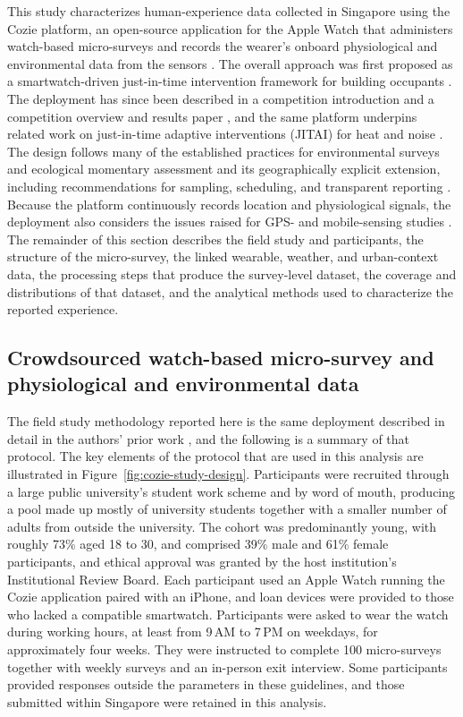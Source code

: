 \documentclass[]{interact}
\begin{document}
This study characterizes human-experience data collected in Singapore using the Cozie platform, an open-source application for the Apple Watch that administers watch-based micro-surveys and records the wearer's onboard physiological and environmental data from the sensors \citep{Tartarini2023-iu}.
The overall approach was first proposed as a smartwatch-driven just-in-time intervention framework for building occupants \citep{Miller2022-dy}.
The deployment has since been described in a competition introduction and a competition overview and results paper \citep{Miller2023-wi,Miller2025-qu}, and the same platform underpins related work on just-in-time adaptive interventions (JITAI) for heat and noise \citep{Miller2025-sv}.
The design follows many of the established practices for environmental surveys and ecological momentary assessment and its geographically explicit extension, including recommendations for sampling, scheduling, and transparent reporting \citep{Reichert2020-fs,Kingsbury2024-qe,Liao2016-ya,Graham2021-en}.
Because the platform continuously records location and physiological signals, the deployment also considers the issues raised for GPS- and mobile-sensing studies \citep{Kerr2011-ve,Fuller2017-xg}.
The remainder of this section describes the field study and participants, the structure of the micro-survey, the linked wearable, weather, and urban-context data, the processing steps that produce the survey-level dataset, the coverage and distributions of that dataset, and the analytical methods used to characterize the reported experience.

\subsection{Crowdsourced watch-based micro-survey and physiological and environmental data}\label{sec:methods-context}
The field study methodology reported here is the same deployment described in detail in the authors' prior work \citep{Miller2025-sv}, and the following is a summary of that protocol. 
The key elements of the protocol that are used in this analysis are illustrated in Figure~\ref{fig:cozie-study-design}.
Participants were recruited through a large public university's student work scheme and by word of mouth, producing a pool made up mostly of university students together with a smaller number of adults from outside the university.
The cohort was predominantly young, with roughly 73\% aged 18 to 30, and comprised 39\% male and 61\% female participants, and ethical approval was granted by the host institution's Institutional Review Board.
Each participant used an Apple Watch running the Cozie application paired with an iPhone, and loan devices were provided to those who lacked a compatible smartwatch.
Participants were asked to wear the watch during working hours, at least from 9\,AM to 7\,PM on weekdays, for approximately four weeks.
They were instructed to complete 100 micro-surveys together with weekly surveys and an in-person exit interview. 
Some participants provided responses outside the parameters in these guidelines, and those submitted within Singapore were retained in this analysis.
\end{document}
